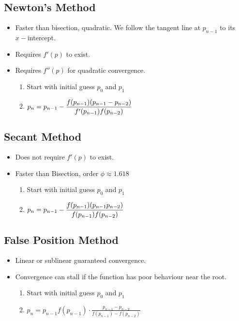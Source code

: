 \documentclass[8pt, letterpaper]{extarticle}
\begin{document}
\begin{multicols*}{3}
  \subsection{Newton's Method}
  \begin{itemize}
    \item Faster than bisection, quadratic. We follow the tangent line at $p_{n-1}$ to its
      $x-$intercept.
    \item Requires $f'(p)$ to exist.
    \item Requires $f''(p)$ for quadratic convergence.
      \begin{enumerate}
        \item Start with initial guess $p_0$ and $p_1$
        \item $\displaystyle p_n = p_{n-1} -
          \frac{f(p_{n-1})\pqty{p_{n-1}-p_{n-2}}}{f'(p_{n-1})f(p_{n-2})}$
      \end{enumerate}
  \end{itemize}

  \subsection{Secant Method}
  \begin{itemize}
    \item Does not require $f'(p)$ to exist.
    \item Faster than Bisection, order $\phi \approx 1.618$
      \begin{enumerate}
      \item Start with initial guess $p_0$ and $p_1$
      \item $\displaystyle p_n = p_{n-1} -
        \frac{f(p_{n-1})\pqty{p_{n-1}p_{n-2}}}{f(p_{n-1})f(p_{n-2})}$
      \end{enumerate}
  \end{itemize}

  \subsection{False Position Method}
  \begin{itemize}
    \item Linear or sublinear guaranteed convergence.
    \item Convergence can stall if the function has poor behaviour near the root.
      \begin{enumerate}
        \item Start with initial guess $p_0$ and $p_1$
        \item $\displaystyle p_n = p_{n-1} f(p_{n-1}) \cdot \frac{p_{n-1}-p_{n-2}}{f(p_{n-1})-f(p_{n-2})}$
      \end{enumerate}
  \end{itemize}


\end{multicols*}
\end{document}
